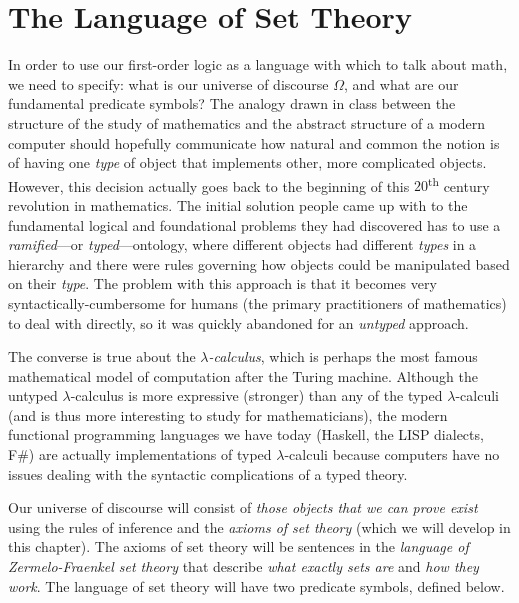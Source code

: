 \section{The Language of Set Theory}
In order to use our first-order logic as a language with which to talk about math,
we need to specify: what is our universe of discourse \(\Omega\), and what are our fundamental predicate symbols?
The analogy drawn in class between the structure of the study of mathematics
and the abstract structure of a modern computer
should hopefully communicate how natural and common the notion is of having one \emph{type} of object
that implements other, more complicated objects.
However, this decision actually goes back to the beginning of
this \(20\)\textsuperscript{th} century revolution in mathematics.
The initial solution people came up with to the fundamental logical and foundational problems they had discovered
has to use a \emph{ramified}---or \emph{typed}---ontology,
where different objects had different \emph{types} in a hierarchy and there were rules governing how objects
could be manipulated based on their \emph{type}.
The problem with this approach is that it becomes very syntactically-cumbersome for humans
(the primary practitioners of mathematics) to deal with directly,
so it was quickly abandoned for an \emph{untyped} approach.
\vspace{-\parskip}
\begin{note}
    The converse is true about the \emph{\(\lambda\)-calculus},
    which is perhaps the most famous mathematical model of computation after the Turing machine.
    Although the untyped \(\lambda\)-calculus is more expressive (\ie stronger)
    than any of the typed \(\lambda\)-calculi (and is thus more interesting to study for mathematicians),
    the modern functional programming languages we have today (\eg Haskell, the LISP dialects, F\#)
    are actually implementations of typed \(\lambda\)-calculi
    because computers have no issues dealing with the syntactic complications of a typed theory.
\end{note}
\vspace{-\parskip}
Our universe of discourse will consist of \emph{those objects that we can prove exist}
using the rules of inference and the \emph{axioms of set theory} (which we will develop in this chapter).
The axioms of set theory will be sentences in the \emph{language of Zermelo-Fraenkel set theory}
that describe \emph{what exactly sets are} and \emph{how they work}.
The language of set theory will have two predicate symbols, defined below.

